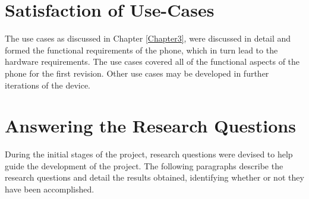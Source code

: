 \section{Satisfaction of Use-Cases}

	The use cases as discussed in Chapter \ref{Chapter3}, were discussed in detail and formed the functional requirements of the phone, which in turn lead to the hardware requirements. 
The use cases covered all of the functional aspects of the phone for the first revision.
Other use cases may be developed in further iterations of the device. 

\section{Answering the Research Questions}

During the initial stages of the project, research questions were devised to help guide the development of the project.
The following paragraphs describe the research questions and detail the results obtained, identifying whether or not they have been accomplished.\\

